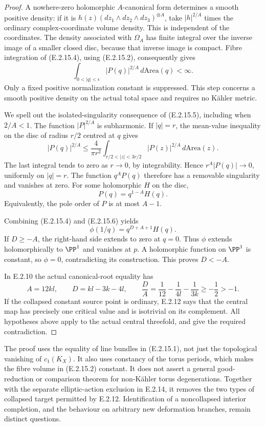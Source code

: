 \begin{proof}
A nowhere-zero holomorphic $A$-canonical form determines
a smooth positive density: if it is
$h(z)(dz_1\wedge dz_2\wedge dz_3)^{\otimes A}$, take
$|h|^{2/A}$ times the ordinary complex-coordinate volume
density.  This is independent of the coordinates.  The
density associated with $\Omega_A$ has finite integral
over the inverse image of a smaller closed disc, because
that inverse image is compact.  Fibre integration of
(E.2.15.4), using (E.2.15.2), consequently gives
\[
 \int_{0<|q|<\epsilon}|P(q)|^{2/A}\,d\mathrm{Area}(q)
 <\infty.
 \tag{E.2.15.5}
\]
Only a fixed positive normalization constant is suppressed.
This step concerns a smooth positive density on the actual
total space and requires no K\"ahler metric.

We spell out the isolated-singularity consequence of
(E.2.15.5), including when $2/A<1$.  The function
$|P|^{2/A}$ is subharmonic.  If $|q|=r$, the mean-value
inequality on the disc of radius $r/2$ centred at $q$ gives
\[
 |P(q)|^{2/A}
 \leq \frac{4}{\pi r^2}
       \int_{r/2<|z|<3r/2}|P(z)|^{2/A}\,d\mathrm{Area}(z).
\]
The last integral tends to zero as $r\to0$, by
integrability.  Hence $r^A|P(q)|\to0$, uniformly on
$|q|=r$.  The function $q^A P(q)$ therefore has a removable
singularity and vanishes at zero.  For some holomorphic
$H$ on the disc,
\[
 P(q)=q^{1-A}H(q).
 \tag{E.2.15.6}
\]
Equivalently, the pole order of $P$ is at most $A-1$.

Combining (E.2.15.4) and (E.2.15.6) yields
\[
 \phi(1/q)=q^{D+A+1}H(q).
 \tag{E.2.15.7}
\]
If $D\geq-A$, the right-hand side extends to zero at
$q=0$.  Thus $\phi$ extends holomorphically to $\PP^1$
and vanishes at $p$.  A holomorphic function on $\PP^1$
is constant, so $\phi=0$, contradicting its construction.
This proves $D<-A$.

In E.2.10 the actual canonical-root equality has
\[
 A=12kl,\qquad D=kl-3k-4l,
 \qquad
 \frac DA=\frac1{12}-\frac1{4l}-\frac1{3k}
       \geq-\frac12>-1.
\]
If the collapsed constant source point is ordinary,
E.2.12 says that the central map has precisely one
critical value and is isotrivial on its complement.
All hypotheses above apply to the actual central
threefold, and give the required contradiction.
\end{proof}

\begin{remark}
The proof uses the equality of line bundles in
(E.2.15.1), not just the topological vanishing of
$c_1(K_X)$.  It also uses constancy of the torus periods,
which makes the fibre volume in (E.2.15.2) constant.
It does not assert a general good-reduction or
comparison theorem for non-K\"ahler torus degenerations.
Together with the separate elliptic-action exclusion
in E.2.14, it removes the two types of collapsed
target permitted by E.2.12.  Identification of a
noncollapsed interior completion, and the behaviour
on arbitrary new deformation branches, remain
distinct questions.
\end{remark}

